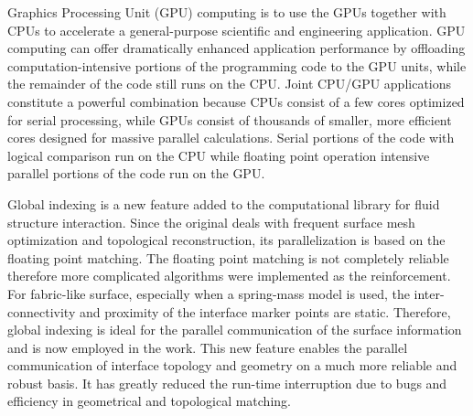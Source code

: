 Graphics Processing Unit (GPU) computing \cite{kirk2010programming} is to use
the GPUs together with CPUs to accelerate a general-purpose scientific and
engineering application.  GPU computing can offer dramatically enhanced
application performance by offloading computation-intensive portions of the
programming code to the GPU units, while the remainder of the code still runs on
the CPU.  Joint CPU/GPU applications constitute a powerful combination because
CPUs consist of a few cores optimized for serial processing, while GPUs consist
of thousands of smaller, more efficient cores designed for massive parallel
calculations.  Serial portions of the code with logical comparison run on the
CPU while floating point operation intensive parallel portions of the code run
on the GPU.

Global indexing is a new feature added to the \FronTierp computational library
for fluid structure interaction.  Since the original \FronTierp
\cite{DuFixGli05} deals with frequent surface mesh optimization and topological
reconstruction, its parallelization is based on the floating point matching.
The floating point matching is not completely reliable therefore more
complicated algorithms were implemented as the reinforcement.  For fabric-like
surface, especially when a spring-mass model is used, the inter-connectivity and
proximity of the interface marker points are static. Therefore, global indexing
is ideal for the parallel communication of the surface information and is now
employed in the work.  This new feature enables the parallel communication of
interface topology and geometry on a much more reliable and robust basis. It has
greatly reduced the run-time interruption due to bugs and efficiency in
geometrical and topological matching.
\newpage{}